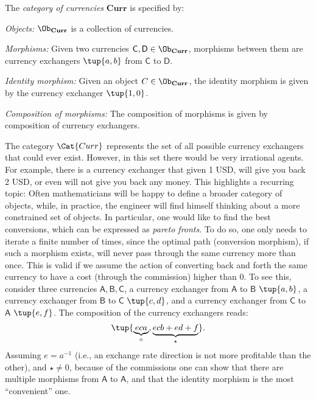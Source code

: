 \begin{definition}
    The \emph{category of currencies} $\mathbf{Curr}$ is specified by:
    \begin{compactenum}
        \item \emph{Objects:} $\Ob_\mathbf{Curr}$ is a collection of currencies.
        \item \emph{Morphisms:} Given two currencies $\mathsf{C},\mathsf{D}\in \Ob_{\mathbf{Curr}}$, morphisms between them are currency exchangers $\tup{a,b}$ from $\mathsf{C}$ to $\mathsf{D}$. 
        \item \emph{Identity morphism:} Given an object $C\in \Ob_\mathbf{Curr}$, the identity morphism is given by the currency exchanger $\tup{1,0}$.
        \item \emph{Composition of morphisms:} The composition of morphisms is given by composition of currency exchangers.
    \end{compactenum}
\end{definition}

The category $\Cat{Curr}$ represents the set of all possible currency exchangers that could
ever exist. However, in this set there would be very irrational agents. For example, there is a currency exchanger that given 1 USD, will give you back 2 USD, or even will not give you back any money. This highlights a recurring topic: Often mathematicians will be happy to define a broader category of objects, while, in practice, the engineer will find himself thinking about a more constrained set of objects. In particular, one would like to find the best conversions, which can be expressed as \emph{pareto fronts}. To do so, one only needs to iterate a finite number of times, since the optimal path (conversion morphism), if such a morphism exists, will never pass through the same currency more than once. This is valid if we assume the action of converting back and forth the same currency to have a cost (through the commission) higher than 0. To see this, consider three currencies $\mathsf{A,B,C}$, a currency exchanger from $\mathsf{A}$ to $\mathsf{B}$  $\tup{a,b}$, a currency exchanger from $\mathsf{B}$ to $\mathsf{C}$ 
$\tup{c,d}$, and a currency exchanger from $\mathsf{C}$ to $\mathsf{A}$ $\tup{e,f}$. The composition of the currency exchangers reads:
\begin{equation}
\tup{\underbrace{eca}_{\diamond}, \underbrace{ecb+ed+f}_{\star}}.
\end{equation}
Assuming $e=a^{-1}$ (i.e., an exchange rate direction is not more profitable than the other), and $\star\neq 0$, because of the commissions one can show that there are multiple morphisms from $\mathsf{A}$ to $\mathsf{A}$, and that the identity morphism is the most ``convenient'' one.




